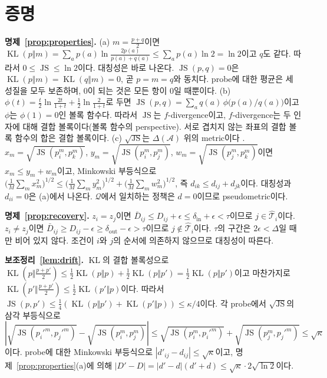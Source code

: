 \documentclass[twocolumn,10pt]{article}
\theoremstyle{remark}
\newcommand{\JS}{\operatorname{JS}}
\newcommand{\KL}{\operatorname{KL}}
\begin{document}



\clearpage
\appendix
\onecolumn

\section{증명}
\label{app:proofs}

\textbf{명제~\ref{prop:properties}.}
(a) $m=\frac{p+q}{2}$이면 $\KL(p\Vert m)=\sum_a p(a)\ln\frac{2p(a)}{p(a)+q(a)}\le\sum_a p(a)\ln 2=\ln 2$이고 $q$도 같다. 따라서
$0\le\JS\le\ln2$이다. 대칭성은 바로 나온다. $\JS(p,q)=0$은 $\KL(p\Vert m)=\KL(q\Vert m)=0$, 곧 $p=m=q$와 동치다. probe에 대한
평균은 세 성질을 모두 보존하며, 0이 되는 것은 모든 항이 0일 때뿐이다.
(b) $\phi(t)=\frac{t}{2}\ln\frac{2t}{1+t}+\frac12\ln\frac{2}{1+t}$로 두면 $\JS(p,q)=\sum_a q(a)\,\phi\!\big(p(a)/q(a)\big)$이고
$\phi$는 $\phi(1)=0$인 볼록 함수다. 따라서 $\JS$는 $f$-divergence이고, $f$-divergence는 두 인자에 대해 결합 볼록이다(볼록 함수의
perspective). 서로 겹치지 않는 좌표의 결합 볼록 함수의 합은 결합 볼록이다.
(c) $\sqrt{\JS}$는 $\Delta(\mathcal{A})$ 위의 metric이다 \cite{endres2003metric}. $x_m=\sqrt{\JS(p_i^m,p_k^m)}$,
$y_m=\sqrt{\JS(p_i^m,p_j^m)}$, $w_m=\sqrt{\JS(p_j^m,p_k^m)}$이면 $x_m\le y_m+w_m$이고, Minkowski 부등식으로
$\big(\frac1M\sum_m x_m^2\big)^{1/2}\le\big(\frac1M\sum_m y_m^2\big)^{1/2}+\big(\frac1M\sum_m w_m^2\big)^{1/2}$, 즉
$d_{ik}\le d_{ij}+d_{jk}$이다. 대칭성과 $d_{ii}=0$은 (a)에서 나온다. $\mathcal{Q}$에서 일치하는 정책은 $d=0$이므로 pseudometric이다.

\textbf{명제~\ref{prop:recovery}.} $z_i=z_j$이면 $\bar D_{ij}\le D_{ij}+\epsilon\le\delta_{\mathrm{in}}+\epsilon<\tau$이므로
$j\in\hat{\mathcal{T}}_i$이다. $z_i\ne z_j$이면 $\bar D_{ij}\ge D_{ij}-\epsilon\ge\delta_{\mathrm{out}}-\epsilon>\tau$이므로
$j\notin\hat{\mathcal{T}}_i$이다. $\tau$의 구간은 $2\epsilon<\Delta$일 때만 비어 있지 않다. 조건이 $i$와 $j$의 순서에 의존하지
않으므로 대칭성이 따른다.

\textbf{보조정리~\ref{lem:drift}.} $\KL$의 결합 볼록성으로 $\KL(p\Vert\frac{p+p'}{2})\le\frac12\KL(p\Vert p)+\frac12\KL(p\Vert p')=\frac12\KL(p\Vert p')$이고
마찬가지로 $\KL(p'\Vert\frac{p+p'}{2})\le\frac12\KL(p'\Vert p)$이다. 따라서 $\JS(p,p')\le\frac14(\KL(p\Vert p')+\KL(p'\Vert p))\le\kappa/4$이다.
각 probe에서 $\sqrt{\JS}$의 삼각 부등식으로
$|\sqrt{\JS(p_i'^m,p_j'^m)}-\sqrt{\JS(p_i^m,p_j^m)}|\le\sqrt{\JS(p_i^m,p_i'^m)}+\sqrt{\JS(p_j^m,p_j'^m)}\le\sqrt{\kappa}$이다. probe에 대한
Minkowski 부등식으로 $|d'_{ij}-d_{ij}|\le\sqrt{\kappa}$이고, 명제~\ref{prop:properties}(a)에 의해
$|D'-D|=|d'-d|(d'+d)\le\sqrt{\kappa}\cdot2\sqrt{\ln 2}$이다.
\end{document}
